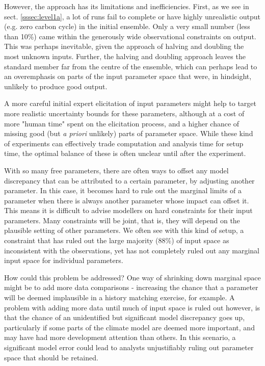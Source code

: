 \documentclass[gmd, manuscript]{copernicus}
\begin{document}
However, the approach has its limitations and inefficiencies. First, as we see in sect. \ref{sssec:level1a}, a lot of runs fail to complete or have highly unrealistic output (e.g. zero carbon cycle) in the initial ensemble. Only a very small number (less than 10\%) came within the generously wide observational constraints on output.  This was perhaps inevitable, given the approach of halving and doubling the most unknown inputs. Further, the halving and doubling approach leaves the standard member far from the centre of the ensemble, which can perhaps lead to an overemphasis on parts of the input parameter space that were, in hindsight, unlikely to produce good output.

A more careful initial expert elicitation of input parameters might help to target more realistic uncertainty bounds for these parameters, although at a cost of more "human time" spent on the elicitation process, and a higher chance of missing good (but \emph{a priori} unlikely) parts of parameter space. While these kind of experiments can effectively trade computation and analysis time for setup time, the optimal balance of these is often unclear until after the experiment.

With so many free parameters, there are often ways to offset any model discrepancy that can be attributed to a certain parameter, by adjusting another parameter. In this case, it becomes hard to rule out the marginal limits of a parameter when there is always another parameter whose impact can offset it. This means it is difficult to advise modellers on hard constraints for their input parameters. Many constraints will be joint, that is, they will depend on the plausible setting of other parameters. We often see with this kind of setup, a constraint that has ruled out the large majority (88\%) of input space as inconsistent with the observations, yet has not completely ruled out any marginal input space for individual parameters.

How could this problem be addressed? One way of shrinking down marginal space might be to add more data comparisons - increasing the chance that a parameter will be deemed implausible in a history matching exercise, for example. A problem with adding more data until much of input space is ruled out however, is that the chance of an unidentified but significant model discrepancy goes up, particularly if some parts of the climate model are deemed more important, and may have had more development attention than others. In this scenario, a significant model error could lead to analysts unjustifiably ruling out parameter space that should be retained.
\end{document}
